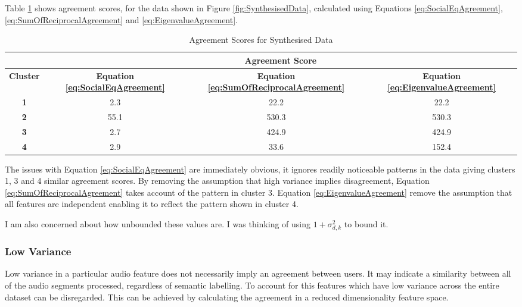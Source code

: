 			Table \ref{tab:SynthesisedDataAgreement} shows agreement scores, for the data shown in Figure
			\ref{fig:SynthesisedData}, calculated using Equations \ref{eq:SocialEqAgreement},
			\ref{eq:SumOfReciprocalAgreement} and \ref{eq:EigenvalueAgreement}.

			\begin{table}[h!]
				\centering
				\begin{tabular}{|c|c|c|c|}
					\cline{2-4}
					\multicolumn{1}{c|}{} & \multicolumn{3}{c|}{\bf{Agreement Score}} \tabularnewline
					\hline
					\bf{Cluster} & \bf{Equation \ref{eq:SocialEqAgreement}} & 
					\bf{Equation \ref{eq:SumOfReciprocalAgreement}} & 
					\bf{Equation \ref{eq:EigenvalueAgreement}} \tabularnewline
					\hline
					\hline
					\bf{1} & 2.3 & 22.2 & 22.2 \tabularnewline
					\hline
					\bf{2} & 55.1 & 530.3 & 530.3 \tabularnewline
					\hline
					\bf{3} & 2.7 & 424.9 & 424.9 \tabularnewline
					\hline
					\bf{4} & 2.9 & 33.6 & 152.4 \tabularnewline
					\hline
				\end{tabular}
				\caption{Agreement Scores for Synthesised Data}
				\label{tab:SynthesisedDataAgreement}
			\end{table}

			The issues with Equation \ref{eq:SocialEqAgreement} are immediately obvious, it ignores readily
			noticeable patterns in the data giving clusters 1, 3 and 4 similar agreement scores. By removing
			the assumption that high variance implies disagreement, Equation \ref{eq:SumOfReciprocalAgreement}
			takes account of the pattern in cluster 3. Equation \ref{eq:EigenvalueAgreement} remove the
			assumption that all features are independent enabling it to reflect the pattern shown in cluster 4.

			\note
			{
				I am also concerned about how unbounded these values are. I was thinking of using $1 +
				\sigma_{d,k}^{2}$ to bound it.
			}

		\subsubsection*{Low Variance}
			Low variance in a particular audio feature does not necessarily imply an agreement between users.
			It may indicate a similarity between all of the audio segments processed, regardless of semantic
			labelling. To account for this features which have low variance across the entire dataset can be
			disregarded. This can be achieved by calculating the agreement in a reduced dimensionality feature
			space.

